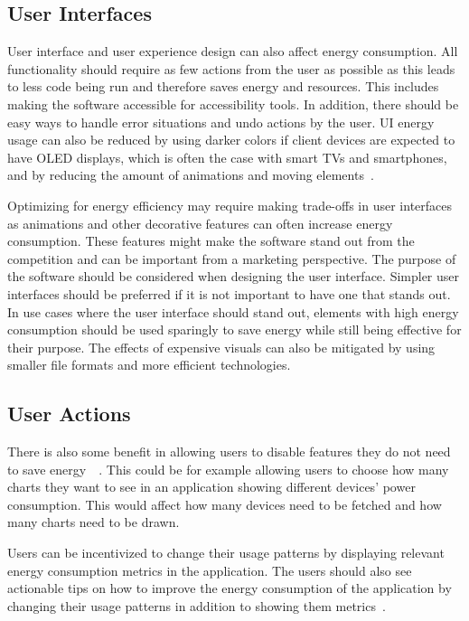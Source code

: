 \subsection{User Interfaces}
User interface and user experience design can also affect energy consumption. All functionality should require as few actions from the user as possible as this leads to less code being run and therefore saves energy and resources. This includes making the software accessible for accessibility tools. In addition, there should be easy ways to handle error situations and undo actions by the user. UI energy usage can also be reduced by using darker colors if client devices are expected to have OLED displays, which is often the case with smart TVs and smartphones, and by reducing the amount of animations and moving elements~\cite{energypatternsforweb}.

Optimizing for energy efficiency may require making trade-offs in user interfaces as animations and other decorative features can often increase energy consumption. These features might make the software stand out from the competition and can be important from a marketing perspective. The purpose of the software should be considered when designing the user interface. Simpler user interfaces should be preferred if it is not important to have one that stands out. In use cases where the user interface should stand out, elements with high energy consumption should be used sparingly to save energy while still being effective for their purpose. The effects of expensive visuals can also be mitigated by using smaller file formats and more efficient technologies.

\subsection{User Actions}
There is also some benefit in allowing users to disable features they do not need to save energy~\cite{energypatternsforweb}~\cite{mitvidi}. This could be for example allowing users to choose how many charts they want to see in an application showing different devices' power consumption. This would affect how many devices need to be fetched and how many charts need to be drawn.

Users can be incentivized to change their usage patterns by displaying relevant energy consumption metrics in the application. The users should also see actionable tips on how to improve the energy consumption of the application by changing their usage patterns in addition to showing them metrics~\cite{impactofgreenfeedback}.

